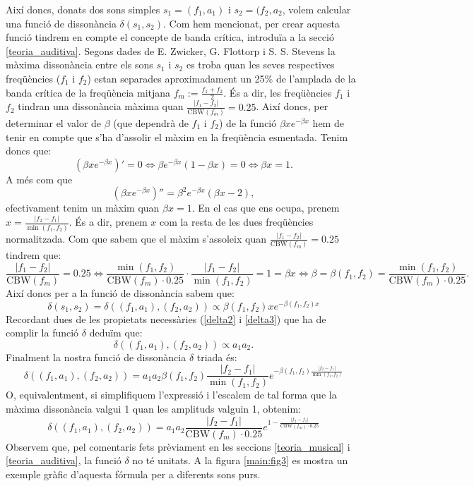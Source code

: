 \documentclass{article}
\theoremstyle{math}
\theoremstyle{TheoremNum}
\newcommand{\0}{\ensuremath{\vb{0}}}
\begin{document}
Així doncs, donats dos sons simples $s_1=(f_1,a_1)$ i $s_2=(f_2,a_2$, volem calcular una funció de dissonància $\delta(s_1,s_2)$. Com hem mencionat, per crear aquesta funció tindrem en compte el concepte de banda crítica, introduïa a la secció \ref{teoria_auditiva}. Segons dades de E. Zwicker, G. Flottorp i S. S. Stevens \cite{zwicker} la màxima dissonància entre els sons $s_1$ i $s_2$ es troba quan les seves respectives freqüències ($f_1$ i $f_2$) estan separades aproximadament un 25\% de l'amplada de la banda crítica de la freqüència mitjana $f_m:=\frac{f_1+f_2}{2}$. És a dir, les freqüències $f_1$ i $f_2$ tindran una dissonància màxima quan $\frac{|f_1-f_2|}{\text{CBW}(f_m)}=0.25$. Així doncs, per determinar el valor de $\beta$ (que dependrà de $f_1$ i $f_2$) de la funció $\beta xe^{-\beta x}$ hem de tenir en compte que s'ha d'assolir el màxim en la freqüència esmentada. Tenim doncs que:
$$\left(\beta xe^{-\beta x}\right)'=0\iff \beta e^{-\beta x}(1-\beta x)=0\iff\beta x=1.$$ A més com que $$\left(\beta xe^{-\beta x}\right)''=\beta^2e^{-\beta x}(\beta x-2),$$ efectivament tenim un màxim quan $\beta x=1$.
En el cas que ens ocupa, prenem $x=\frac{|f_2-f_1|}{\min(f_1,f_2)}$. És a dir, prenem $x$ com la resta de les dues freqüències normalitzada. Com que sabem que el màxim s'assoleix quan $\frac{|f_1-f_2|}{\text{CBW}(f_m)}=0.25$ tindrem que:
$$\frac{|f_1-f_2|}{\text{CBW}(f_m)}=0.25\iff\frac{\min(f_1, f_2)}{\text{CBW}(f_m)\cdot 0.25}\cdot\frac{|f_1-f_2|}{\min(f_1, f_2)}=1=\beta x\iff\beta=\beta(f_1,f_2)=\frac{\min(f_1, f_2)}{\text{CBW}(f_m)\cdot 0.25}.$$
Així doncs per a la funció de dissonància sabem que: $$\delta(s_1,s_2)=\delta((f_1,a_1),(f_2,a_2))\propto\beta(f_1,f_2)xe^{-\beta(f_1,f_2)x}$$ Recordant dues de les propietats necessàries (\ref{delta2} i \ref{delta3}) que ha de complir la funció $\delta$ deduïm que: $$\delta((f_1,a_1),(f_2,a_2))\propto a_1a_2.$$ Finalment la nostra funció de dissonància $\delta$ triada és: $$\delta((f_1,a_1),(f_2,a_2))=a_1a_2\beta(f_1,f_2)\frac{|f_2-f_1|}{\min(f_1,f_2)}e^{-\beta(f_1,f_2)\frac{|f_2-f_1|}{\min(f_1,f_2)}}$$
O, equivalentment, si simplifiquem l'expressió i l'escalem de tal forma que la màxima dissonància valgui 1 quan les amplituds valguin 1, obtenim: 
\begin{equation}
    \delta((f_1,a_1),(f_2,a_2))=a_1a_2\frac{|f_2-f_1|}{\text{CBW}(f_m)\cdot 0.25}e^{1-\frac{|f_2-f_1|}{\text{CBW}(f_m)\cdot 0.25}}
    \label{for:dissonancia}
\end{equation}
Observem que, pel comentaris fets prèviament en les seccions \ref{teoria_musical} i \ref{teoria_auditiva}, la funció $\delta$ no té unitats. A la figura \ref{main:fig3} es mostra un exemple gràfic d'aquesta fórmula per a diferents sons purs.
\begin{center}
    
    \label{main:fig3}
\end{center}
\end{document}
